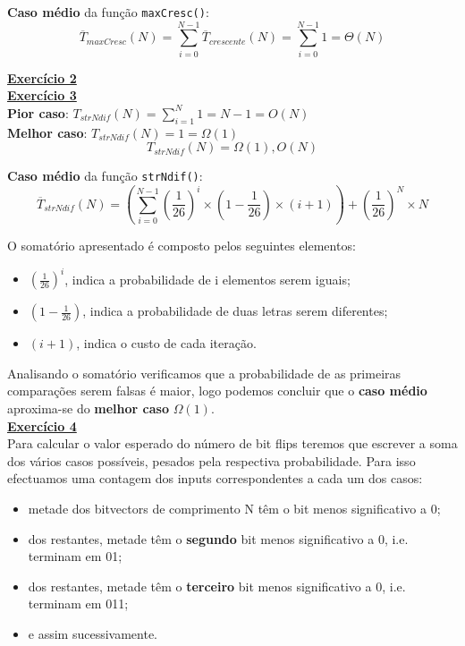 \documentclass[a4paper,11pt]{article}
\begin{document}
	\noindent \textbf{Caso médio} da função \texttt{maxCresc()}:
	\[
		\overline{T}_{maxCresc}(N) = \sum_{i=0}^{N-1} \overline{T}_{crescente}(N) = \sum_{i=0}^{N-1} 1 = \Theta(N)
	\]
	
	\newpage
	
	
	\noindent \underline{\textbf{Exercício 2}}\\
	
	
	
	\noindent \underline{\textbf{Exercício 3}}\\
	
	\noindent \textbf{Pior caso}: $ T_{strNdif}(N) = \sum_{i=1}^{N} 1 = N - 1 = O(N) $\\
	
	\noindent \textbf{Melhor caso}: $ T_{strNdif}(N) = 1 = \Omega(1) $
	\[
		T_{strNdif}(N) = \Omega(1), O(N)
	\]
	
	\noindent \textbf{Caso médio} da função \texttt{strNdif()}:
	\[
		\overline{T}_{strNdif}(N) = \left(\sum_{i=0}^{N-1} \left(\frac{1}{26}\right)^i \times \left(1-\frac{1}{26}\right) \times (i+1)\right) + \left(\frac{1}{26}\right)^N \times N
	\]
	
	\noindent O somatório apresentado é composto pelos seguintes elementos:
	\begin{itemize}
		\item $\left(\frac{1}{26}\right)^i$, indica a probabilidade de i elementos serem iguais;
		\item $\left(1-\frac{1}{26}\right)$, indica a probabilidade de duas letras serem diferentes;
		\item $(i+1)$, indica o custo de cada iteração.
	\end{itemize}
	\noindent Analisando o somatório verificamos que a probabilidade de as primeiras comparações serem falsas é maior, logo podemos concluir que o \textbf{caso médio} aproxima-se do \textbf{melhor caso} $\Omega(1)$.\\
	
	
	\noindent \underline{\textbf{Exercício 4}}\\
	
	\noindent Para calcular o valor esperado do número de bit flips teremos que escrever a soma dos vários casos possíveis, pesados pela respectiva probabilidade. Para isso efectuamos uma contagem dos inputs correspondentes a cada um dos casos:
	
	\begin{itemize}
		\item metade dos bitvectors de comprimento N têm o bit menos significativo a 0;
		\item dos restantes, metade têm o \textbf{segundo} bit menos significativo a 0, i.e. terminam em 01;
		\item dos restantes, metade têm o \textbf{terceiro} bit menos significativo a 0, i.e. terminam em 011;
		\item e assim sucessivamente.
	\end{itemize}
	
\end{document}
